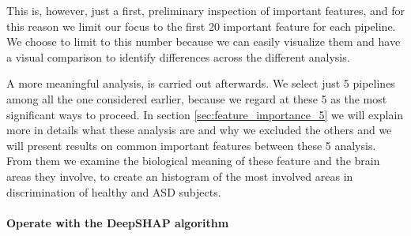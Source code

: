 \documentclass[11pt]{report}
\begin{document}
This is, however, just a first, preliminary inspection of important features, and for this reason we limit our focus to the first 20 important feature for each pipeline.
We choose to limit to this number because we can easily visualize them and have a visual comparison to identify differences across the different analysis.

A more meaningful analysis, is carried out afterwards.
We select just 5 pipelines among all the one considered earlier, because we regard at these 5 as the most significant ways to proceed.
In section \ref{sec:feature_importance_5} we will explain more in details  what these analysis are and why we excluded the others and we will present results on common important features between these 5 analysis.
From them we examine the biological meaning of these feature and the brain areas they involve, to create an histogram of the most involved areas in discrimination of healthy and ASD subjects.

\hfill

\paragraph{Operate with the DeepSHAP algorithm}\hfill
\end{document}
